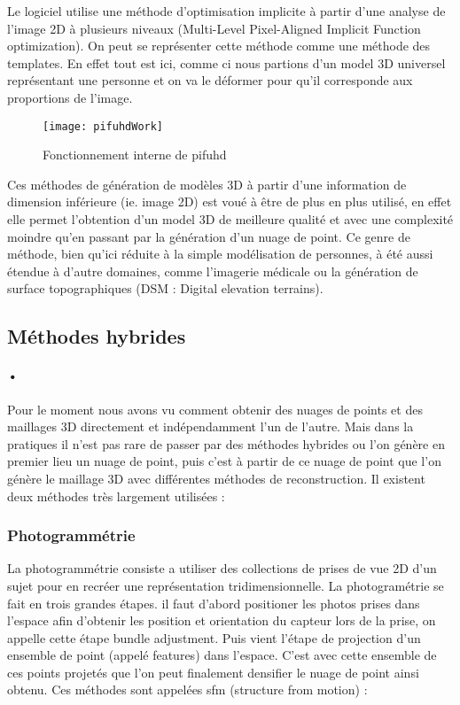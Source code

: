 Le logiciel utilise une méthode d'optimisation implicite à partir d'une analyse de l'image 2D à plusieurs niveaux (Multi-Level Pixel-Aligned Implicit Function optimization). On peut se représenter cette méthode comme une méthode des templates. En effet tout est ici, comme ci nous partions d'un model 3D universel représentant une personne et on va le déformer pour qu'il corresponde aux proportions de l'image.

\begin{figure}[h]
    \centering
    \texttt{[image: pifuhdWork]}
    \caption{Fonctionnement interne de pifuhd}
    \label{fig:pifuhdWork}
\end{figure}
\FloatBarrier

Ces méthodes de génération de modèles 3D à partir d'une information de dimension inférieure (ie. image 2D) est voué à être de plus en plus utilisé, en effet elle permet l'obtention d'un model 3D de meilleure qualité et avec une complexité moindre qu'en passant par la génération d'un nuage de point. Ce genre de méthode, bien qu'ici réduite à la simple modélisation de personnes, à été aussi étendue à d'autre domaines, comme l'imagerie médicale ou la génération de surface topographiques (DSM : Digital elevation terrains)\cite{DSM}.


\subsection{Méthodes hybrides}

\paragraph{•} Pour le moment nous avons vu comment obtenir des nuages de points et des maillages 3D directement et indépendamment l'un de l'autre. Mais dans la pratiques il n'est pas rare de passer par des méthodes hybrides ou l'on génère en premier lieu un nuage de point, puis c'est à partir de ce nuage de point que l'on génère le maillage 3D avec différentes méthodes de reconstruction. Il existent deux méthodes très largement utilisées :

\subsubsection{Photogrammétrie} La photogrammétrie  consiste a utiliser des collections de prises de vue 2D d'un sujet pour en recréer une représentation tridimensionnelle. La photogramétrie se fait en trois grandes étapes. il faut d'abord positioner les photos prises dans l'espace afin d'obtenir les position et orientation du capteur lors de la prise, on appelle cette étape bundle adjustment. Puis vient l'étape de projection d'un ensemble de point (appelé features) dans l'espace. C'est avec cette ensemble de ces points projetés que l'on peut finalement densifier le nuage de point ainsi obtenu. Ces méthodes sont appelées sfm (structure from motion) \cite{orb} \cite{mvg} :

